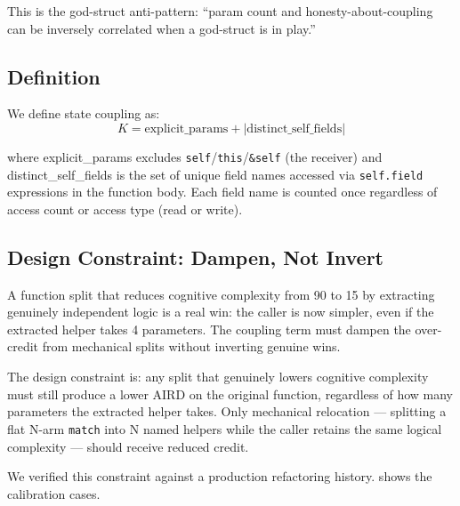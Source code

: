\documentclass[10pt,twocolumn,letterpaper]{article}
\begin{document}
This is the god-struct anti-pattern: ``param count and honesty-about-coupling
can be inversely correlated when a god-struct is in play.''

\subsection{Definition}

We define state coupling as:
\begin{equation}
K = \text{explicit\_params} + |\text{distinct\_self\_fields}|
\label{eq:coupling}
\end{equation}

where explicit\_params excludes \texttt{self}/\texttt{this}/\texttt{\&self}
(the receiver) and distinct\_self\_fields is the set of unique field names
accessed via \texttt{self.field} expressions in the function body.
Each field name is counted once regardless of access count or access type
(read or write).

\subsection{Design Constraint: Dampen, Not Invert}

A function split that reduces cognitive complexity from 90 to 15 by
extracting genuinely independent logic is a real win: the caller is now
simpler, even if the extracted helper takes 4 parameters.  The coupling
term must dampen the over-credit from mechanical splits without inverting
genuine wins.

The design constraint is: any split that genuinely lowers cognitive
complexity must still produce a lower AIRD on the original function,
regardless of how many parameters the extracted helper takes.  Only
mechanical relocation --- splitting a flat N-arm \texttt{match} into N
named helpers while the caller retains the same logical complexity ---
should receive reduced credit.

We verified this constraint against a production refactoring history.
 shows the calibration cases.
\end{document}
